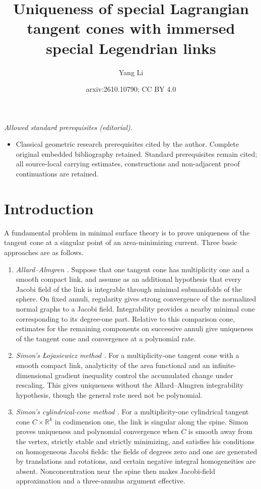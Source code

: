 \documentclass[11pt,a4paper]{article}
\title{Uniqueness of special Lagrangian tangent cones with immersed special Legendrian links}
\author{Yang Li}
\date{arxiv:2610.10790; CC BY 4.0}
\numberwithin{equation}{section}
\theoremstyle{definition}
\theoremstyle{remark}
\newcommand{\R}{\mathbb R}
\begin{document}
\maketitle
\noindent\textit{Allowed standard prerequisites (editorial).}\begin{itemize}
\item Classical geometric research prerequisites cited by the author. Complete original embedded bibliography retained. Standard prerequisites remain cited; all source-local carrying estimates, constructions and non-adjacent proof continuations are retained.
\end{itemize}\medskip
	\section{Introduction}\label{sect:introduction}
	
	A fundamental problem in minimal surface theory is to prove uniqueness
	of the tangent cone at a singular point of an area-minimizing current.
	Three basic approaches are as follows.
	\begin{enumerate}
		\item \emph{Allard--Almgren \cite{AllardAlmgren}.}
		Suppose that one tangent cone has multiplicity one and a smooth compact
		link, and assume as an additional hypothesis that every Jacobi field of
		the link is integrable through minimal submanifolds of the sphere.
		On fixed annuli, regularity gives strong convergence of the normalized
		normal graphs to a Jacobi field. Integrability provides a nearby minimal
		cone corresponding to its degree-one part. Relative to this comparison
		cone, estimates for the remaining components on successive annuli give
		uniqueness of the tangent cone and convergence at a polynomial rate.
		
		\item \emph{Simon's \L{}ojasiewicz method \cite{Simon83}.}
		For a multiplicity-one tangent cone with a smooth compact link, analyticity
		of the area functional and an infinite-dimensional gradient inequality
		control the accumulated change under rescaling. This gives uniqueness
		without the Allard--Almgren integrability hypothesis, though the general
		rate need not be polynomial.
		
		\item \emph{Simon's cylindrical-cone method \cite{Simon93,Simon94}.}
		For a multiplicity-one cylindrical tangent cone $C\times\R^k$ in
		codimension one, the link is singular along the spine. Simon proves
		uniqueness and polynomial convergence when $C$ is smooth away from the
		vertex, strictly stable and strictly minimizing, and satisfies his
		conditions on homogeneous Jacobi fields: the fields of degrees zero and one
		are generated by translations and rotations, and certain negative
		integral homogeneities are absent. Nonconcentration near the spine then
		makes Jacobi-field approximation and a three-annulus argument effective.
	\end{enumerate}
	
\end{document}
